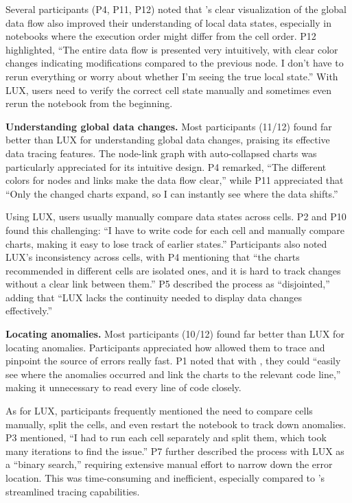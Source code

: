 Several participants (P4, P11, P12) noted that \system{}'s clear visualization of the global data flow also improved their understanding of local data states, especially in notebooks where the execution order might differ from the cell order. P12 highlighted, ``The entire data flow is presented very intuitively, with clear color changes indicating modifications compared to the previous node. I don't have to rerun everything or worry about whether I'm seeing the true local state.'' With LUX, users need to verify the correct cell state manually and sometimes even rerun the notebook from the beginning.

\textbf{Understanding global data changes.}
Most participants (11/12) found \system{} far better than LUX for understanding global data changes, praising its effective data tracing features. 
The node-link graph with auto-collapsed charts was particularly appreciated for its intuitive design. 
P4 remarked, ``The different colors for nodes and links make the data flow clear,'' while P11 appreciated that ``Only the changed charts expand, so I can instantly see where the data shifts.'' 

Using LUX, users usually manually compare data states across cells. P2 and P10 found this challenging: ``I have to write code for each cell and manually compare charts, making it easy to lose track of earlier states.'' Participants also noted LUX's inconsistency across cells, with P4 mentioning that ``the charts recommended in different cells are isolated ones, and it is hard to track changes without a clear link between them.'' P5 described the process as ``disjointed,'' adding that ``LUX lacks the continuity needed to display data changes effectively.''

\textbf{Locating anomalies.}
Most participants (10/12) found \system{} far better than LUX for locating anomalies. Participants appreciated how \system{} allowed them to trace and pinpoint the source of errors really fast. P1 noted that with \system{}, they could ``easily see where the anomalies occurred and link the charts to the relevant code line,'' making it unnecessary to read every line of code closely. 

As for LUX, participants frequently mentioned the need to compare cells manually, split the cells, and even restart the notebook to track down anomalies. 
P3 mentioned, ``I had to run each cell separately and split them, which took many iterations to find the issue.'' 
P7 further described the process with LUX as a ``binary search,'' requiring extensive manual effort to narrow down the error location. This was time-consuming and inefficient, especially compared to \system{}'s streamlined tracing capabilities.